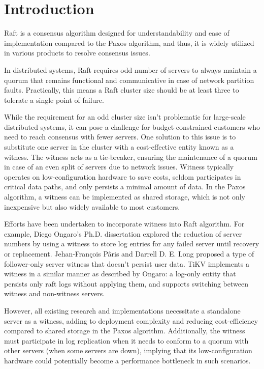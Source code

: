 \section{Introduction}\label{section:intro}
Raft is a consensus algorithm designed for understandability and ease of implementation compared to the Paxos algorithm, and thus, it is widely utilized in various products to resolve consensus issues.

In distributed systems, Raft requires odd number of servers to always maintain a quorum that remains functional and communicative in case of network partition faults. Practically, this means a Raft cluster size should be at least three to tolerate a single point of failure.

While the requirement for an odd cluster size isn't problematic for large-scale distributed systems, it can pose a challenge for budget-constrained customers who need to reach consensus with fewer servers. One solution to this issue is to substitute one server in the cluster with a cost-effective entity known as a witness. The witness acts as a tie-breaker, ensuring the maintenance of a quorum in case of an even split of servers due to network issues. Witness typically operates on low-configuration hardware to save costs, seldom participates in critical data paths, and only persists a minimal amount of data. In the Paxos algorithm, a witness can be implemented as shared storage, which is not only inexpensive but also widely available to most customers.

Efforts have been undertaken to incorporate witness into Raft algorithm. For example, Diego Ongaro's Ph.D. dissertation explored the reduction of server numbers by using a witness to store log entries for any failed server until recovery or replacement. Jehan-François Pâris and Darrell D. E. Long proposed a type of follower-only server witness that doesn't persist user data. TiKV implements a witness in a similar manner as described by Ongaro: a log-only entity that persists only raft logs without applying them, and supports switching between witness and non-witness servers.

However, all existing research and implementations necessitate a standalone server as a witness, adding to deployment complexity and reducing cost-efficiency compared to shared storage in the Paxos algorithm. Additionally, the witness must participate in log replication when it needs to conform to a quorum with other servers (when some servers are down), implying that its low-configuration hardware could potentially become a performance bottleneck in such scenarios.
